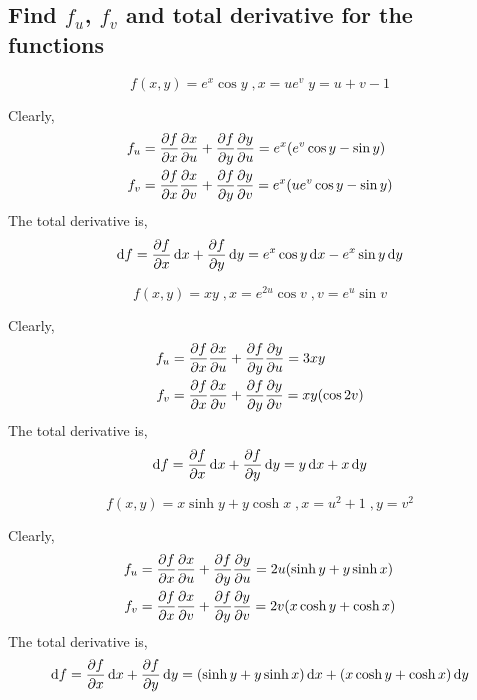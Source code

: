 \subsection{Find $f_u$, $f_v$ and total derivative for the functions}
\begin{asign}
	\[f(x,y)=e^x\cos y \; , x=ue^v \; y=u+v-1\]
\end{asign}
\begin{anse}
	Clearly,
	\[\begin{split}
		f_u&=\pdv{f}{x}\pdv{x}{u}+\pdv{f}{y}\pdv{y}{u}=e^x(e^v\cos y-\sin y)\\
		f_v&=\pdv{f}{x}\pdv{x}{v}+\pdv{f}{y}\pdv{y}{v}=e^x(ue^v\cos y-\sin y)
	\end{split}\]
	The total derivative is,
	\[\dd{f}=\pdv{f}{x}\dd{x}+\pdv{f}{y}\dd{y}=e^x\cos y\dd{x} -e^x\sin y\dd{y}\]
\end{anse}
\begin{asign}
	\[f(x,y)=xy \; , x=e^{2u}\cos v \; , v=e^u\sin v\]
\end{asign}
\begin{anse}
	Clearly,
	\[\begin{split}
		f_u&=\pdv{f}{x}\pdv{x}{u}+\pdv{f}{y}\pdv{y}{u}= 3xy \\
		f_v&=\pdv{f}{x}\pdv{x}{v}+\pdv{f}{y}\pdv{y}{v}= xy(\cos2v)
	\end{split}\]
	The total derivative is,
	\[\dd{f}=\pdv{f}{x}\dd{x}+\pdv{f}{y}\dd{y}=y\dd{x}+x\dd{y}\]
\end{anse}
\begin{asign}
	\[f(x,y)=x\sinh y + y\cosh x \; , x=u^2+1 \; ,y=v^2\]
\end{asign}
\begin{anse}
	Clearly,
	\[\begin{split}
		f_u&=\pdv{f}{x}\pdv{x}{u}+\pdv{f}{y}\pdv{y}{u}= 2u(\sinh y+y\sinh x) \\
		f_v&=\pdv{f}{x}\pdv{x}{v}+\pdv{f}{y}\pdv{y}{v}= 2v(x\cosh y+\cosh x)
	\end{split}\]
	The total derivative is,
	\[\dd{f}=\pdv{f}{x}\dd{x}+\pdv{f}{y}\dd{y}=(\sinh y+y\sinh x)\dd{x} + (x\cosh y+\cosh x)\dd{y}\]
\end{anse}
